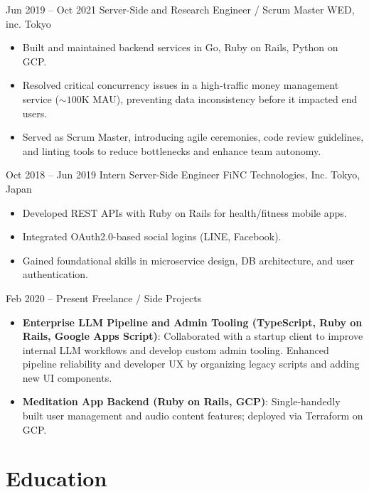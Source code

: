 \documentclass[11pt,letterpaper]{moderncv}
\begin{document}
\cventry
    {Jun 2019 -- Oct 2021}
    {Server-Side and Research Engineer / Scrum Master}
    {WED, inc.}
    {Tokyo}
    {}
    {
      \begin{itemize}
        \item Built and maintained backend services in Go, Ruby on Rails, Python on GCP.
        \item Resolved critical concurrency issues in a high-traffic money management service ($\sim100\mathrm{K}$ MAU), preventing data inconsistency before it impacted end users.
        \item Served as Scrum Master, introducing agile ceremonies, code review guidelines, and linting tools to reduce bottlenecks and enhance team autonomy.
      \end{itemize}
    }

\cventry
    {Oct 2018 -- Jun 2019}
    {Intern Server-Side Engineer}
    {FiNC Technologies, Inc.}
    {Tokyo, Japan}
    {}
    {
      \begin{itemize}
        \item Developed REST APIs with Ruby on Rails for health/fitness mobile apps.
        \item Integrated OAuth2.0-based social logins (LINE, Facebook).
        \item Gained foundational skills in microservice design, DB architecture, and user authentication.
      \end{itemize}
    }

\cventry
    {Feb 2020 -- Present}
    {Freelance / Side Projects}
    {}
    {}
    {}
    {
      \begin{itemize}
        \item \textbf{Enterprise LLM Pipeline and Admin Tooling (TypeScript, Ruby on Rails, Google Apps Script)}:
        Collaborated with a startup client to improve internal LLM workflows and develop custom admin tooling.
        Enhanced pipeline reliability and developer UX by organizing legacy scripts and adding new UI components.
        \item \textbf{Meditation App Backend (Ruby on Rails, GCP)}:
        Single-handedly built user management and audio content features; deployed via Terraform on GCP.
      \end{itemize}
    }

\section{Education}
\end{document}
